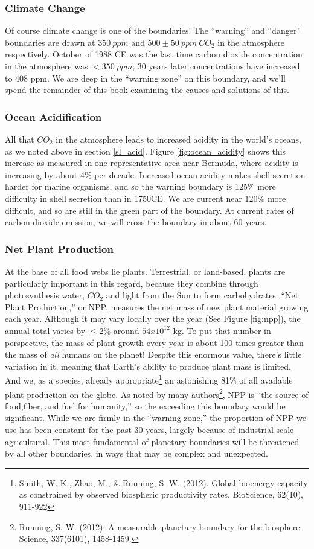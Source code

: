 \subsubsection{Climate Change}
Of course climate change is one of the boundaries! The ``warning'' and ``danger'' boundaries are drawn at $350\: ppm$ and $500\pm50\:ppm\: CO_2$ in the atmosphere respectively. October of 1988 CE was the last time carbon dioxide concentration in the atmosphere was $<350\: ppm$; 30 years later concentrations have increased to 408 ppm. We are deep in the ``warning zone'' on this boundary, and we'll spend the remainder of this book examining the causes and solutions of this.

\subsubsection{Ocean Acidification}
All that $CO_2$ in the atmosphere leads to increased acidity in the world's oceans, as we noted above in section \ref{sl_acid}. Figure \ref{fig:ocean_acidity} shows this increase as measured in one representative area near Bermuda, where acidity is increasing by about 4\% per decade. Increased ocean acidity makes shell-secretion harder for marine organisms, and so the warning boundary is 125\% more difficulty in shell secretion than in 1750CE. We are current near 120\% more difficult, and so are still in the green part of the boundary. At current rates of carbon dioxide emission, we will cross the boundary in about 60 years.

\subsubsection{Net Plant Production}
At the base of all food webs lie plants. Terrestrial, or land-based, plants are particularly important in this regard, because they combine through photosynthesis water, $CO_2$ and light from the Sun to form carbohydrates. ``Net Plant Production,'' or NPP, measures the net mass of new plant material growing each year. Although it may vary locally over the year (See Figure \ref{fig:npp}), the annual total varies by $\leq2\%$ around $54x10^{12}$ kg. To put that number in perspective, the mass of plant growth every year is about 100 times greater than the mass of \emph{all} humans on the planet! Despite this enormous value, there's little variation in it, meaning that Earth's ability to produce plant mass is limited. And we, as a species, already appropriate\footnote{Smith, W. K., Zhao, M., \& Running, S. W. (2012). Global bioenergy capacity as constrained by observed biospheric productivity rates. BioScience, 62(10), 911-922} an astonishing 81\% of all available plant production on the globe. As noted by many authors\footnote{Running, S. W. (2012). A measurable planetary boundary for the biosphere. Science, 337(6101), 1458-1459.}, NPP is ``the source of food,fiber, and fuel for humanity,'' so the exceeding this boundary would be significant. While we are firmly in the ``warning zone,'' the proportion of NPP we use has been constant for the past 30 years, largely because of industrial-scale agricultural. This most fundamental of planetary boundaries will be threatened by all other boundaries, in ways that may be complex and unexpected. 

